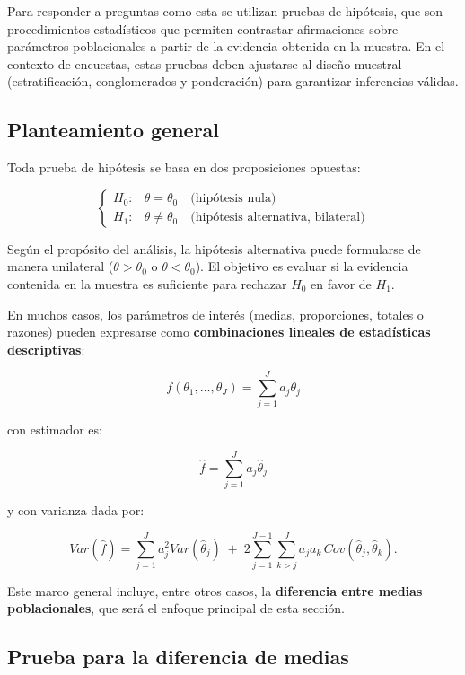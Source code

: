 \documentclass[
  spanish,
  12pt,
]{book}
\begin{document}
Para responder a preguntas como esta se utilizan pruebas de hipótesis, que son procedimientos estadísticos que permiten contrastar afirmaciones sobre parámetros poblacionales a partir de la evidencia obtenida en la muestra. En el contexto de encuestas, estas pruebas deben ajustarse al diseño muestral (estratificación, conglomerados y ponderación) para garantizar inferencias válidas.

\subsection{Planteamiento general}\label{planteamiento-general}

Toda prueba de hipótesis se basa en dos proposiciones opuestas:

\[
\begin{cases}
H_{0}: & \theta = \theta_0 \quad \text{(hipótesis nula)} \\
H_{1}: & \theta \neq \theta_0 \quad \text{(hipótesis alternativa, bilateral)}
\end{cases}
\]

Según el propósito del análisis, la hipótesis alternativa puede formularse de manera unilateral (\(\theta > \theta_0\) o \(\theta < \theta_0\)). El objetivo es evaluar si la evidencia contenida en la muestra es suficiente para rechazar \(H_0\) en favor de \(H_1\).

En muchos casos, los parámetros de interés (medias, proporciones, totales o razones) pueden expresarse como \textbf{combinaciones lineales de estadísticas descriptivas}:

\[
f(\theta_1,\ldots,\theta_J) = \sum_{j=1}^J a_j \theta_j
\]

con estimador es:

\[
\hat{f} = \sum_{j=1}^J a_j \hat{\theta}_j
\]

y con varianza dada por:

\[
Var(\hat{f}) = \sum_{j=1}^J a_j^2 Var(\hat{\theta}_j) \;+\; 2\sum_{j=1}^{J-1}\sum_{k>j}^J a_j a_k \, Cov(\hat{\theta}_j,\hat{\theta}_k).
\]

Este marco general incluye, entre otros casos, la \textbf{diferencia entre medias poblacionales}, que será el enfoque principal de esta sección.

\subsection{Prueba para la diferencia de medias}\label{prueba-para-la-diferencia-de-medias}
\end{document}
